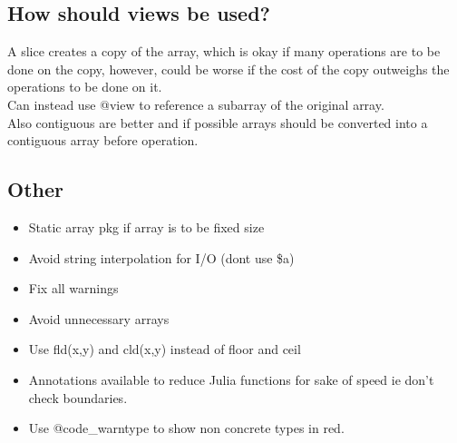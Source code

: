 \documentclass[11pt]{scrartcl} %
\begin{document}
\subsection{How should views be used?}

A slice creates a copy of the array, which is okay if many operations are to be done on the
copy, however, could be worse if the cost of the copy outweighs the operations to be done on it.\\

Can instead use @view to reference a subarray of the original array.\\

Also contiguous are better and if possible arrays should be converted into a contiguous array
before operation.

\subsection{Other}

\begin{itemize}
	\item Static array pkg if array is to be fixed size
	\item Avoid string interpolation for I/O (dont use \$a)
	\item Fix all warnings
	\item Avoid unnecessary arrays
	\item Use fld(x,y) and cld(x,y) instead of floor and ceil
	\item Annotations available to reduce Julia functions for sake of speed ie don't check boundaries.
	\item Use @code\_warntype to show non concrete types in red.
\end{itemize}



\end{document}
